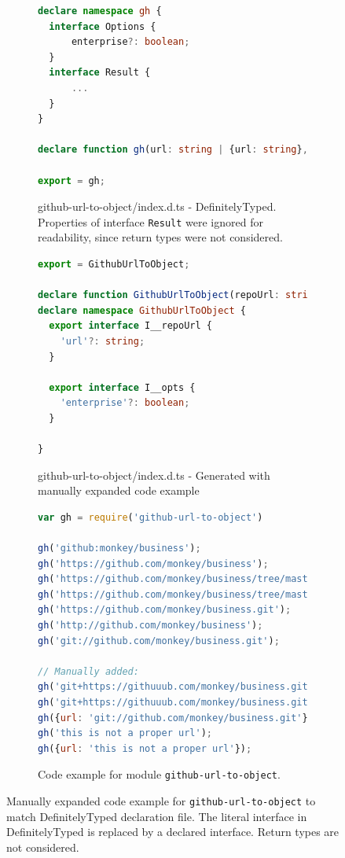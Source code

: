 \documentclass[sigconf]{acmart}
\begin{document}
\begin{figure}[t]
  \centering
  \begin{subfigure}[t]{0.45\linewidth}
    \begin{lstlisting}[language=TypeScript]
declare namespace gh {
  interface Options {
      enterprise?: boolean;
  }
  interface Result {
      ...
  }
}

declare function gh(url: string | {url: string}, options?: gh.Options): gh.Result | null;

export = gh;    
    \end{lstlisting}
    \caption{github-url-to-object/index.d.ts - DefinitelyTyped. Properties of interface \texttt{Result} were ignored for readability, since return types were not considered.}
  \end{subfigure}
  \hfill
  \begin{subfigure}[t]{0.45\linewidth}
    \begin{lstlisting}[language=TypeScript]
export = GithubUrlToObject;

declare function GithubUrlToObject(repoUrl: string | GithubUrlToObject.I__repoUrl, opts?: GithubUrlToObject.I__opts): object | null;
declare namespace GithubUrlToObject {
  export interface I__repoUrl {
    'url'?: string;
  }

  export interface I__opts {
    'enterprise'?: boolean;
  }

}
    \end{lstlisting}
    \caption{github-url-to-object/index.d.ts - Generated with manually expanded code example}
  \end{subfigure}

  \begin{subfigure}{0.80\linewidth}
    \begin{lstlisting}[language=JavaScript]
var gh = require('github-url-to-object')

gh('github:monkey/business');
gh('https://github.com/monkey/business');
gh('https://github.com/monkey/business/tree/master');
gh('https://github.com/monkey/business/tree/master/nested/file.js');
gh('https://github.com/monkey/business.git');
gh('http://github.com/monkey/business');
gh('git://github.com/monkey/business.git');

// Manually added:
gh('git+https://githuuub.com/monkey/business.git', {});
gh('git+https://githuuub.com/monkey/business.git', {enterprise: true});
gh({url: 'git://github.com/monkey/business.git'});
gh('this is not a proper url');
gh({url: 'this is not a proper url'});
    \end{lstlisting}
    \caption{Code example for module \texttt{github-url-to-object}.}
    \end{subfigure}
  \caption{Manually expanded code example for
    \texttt{github-url-to-object} to match DefinitelyTyped declaration
    file. The literal interface in DefinitelyTyped is replaced by a
    declared interface. Return types are not considered.} 
  \label{fig:experiments-results-manually-completed-examples}
\end{figure}
\end{document}
